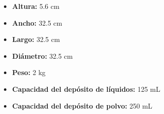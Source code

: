\documentclass{article}
\begin{document}
\begin{adjustwidth}{2em}{}
\begin{itemize}
\begin{itemize}
    \item \textbf {Altura:} 5.6 cm
    \item \textbf {Ancho:} 32.5 cm
    \item \textbf {Largo:} 32.5 cm
    \item \textbf {Diámetro:} 32.5 cm
    \item \textbf {Peso:} 2 kg
    \item \textbf {Capacidad del depósito de líquidos:} 125 mL
    \item \textbf {Capacidad del depósito de polvo:} 250 mL
    \end{itemize}
\end{itemize}

\vspace{1\baselineskip} %
\end{adjustwidth}
\end{document}
